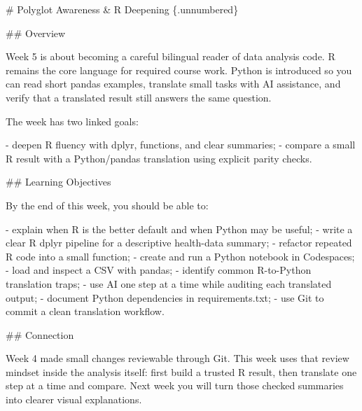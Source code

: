 \documentclass[
  letterpaper,
  DIV=11,
  numbers=noendperiod,
  oneside]{scrreprt}
\newenvironment{Shaded}{\begin{snugshade}}{\end{snugshade}}
\newcommand{\FunctionTok}[1]{\textcolor[rgb]{0.28,0.35,0.67}{#1}}
\newcommand{\InformationTok}[1]{\textcolor[rgb]{0.37,0.37,0.37}{#1}}
\newcommand{\NormalTok}[1]{\textcolor[rgb]{0.00,0.23,0.31}{#1}}
\newcommand{\SpecialStringTok}[1]{\textcolor[rgb]{0.13,0.47,0.30}{#1}}
\begin{document}
\begin{Shaded}
\begin{Highlighting}[numbers=left,,]
\FunctionTok{\# Polyglot Awareness \& R Deepening \{.unnumbered\}}


\FunctionTok{\#\# Overview}

\NormalTok{Week 5 is about becoming a careful bilingual reader of data analysis code. R remains the core language for required course work. Python is introduced so you can read short }\InformationTok{\textasciigrave{}pandas\textasciigrave{}}\NormalTok{ examples, translate small tasks with AI assistance, and verify that a translated result still answers the same question.}

\NormalTok{The week has two linked goals:}

\SpecialStringTok{{-} }\NormalTok{deepen R fluency with }\InformationTok{\textasciigrave{}dplyr\textasciigrave{}}\NormalTok{, functions, and clear summaries;}
\SpecialStringTok{{-} }\NormalTok{compare a small R result with a Python/pandas translation using explicit parity checks.}

\FunctionTok{\#\# Learning Objectives}

\NormalTok{By the end of this week, you should be able to:}

\SpecialStringTok{{-} }\NormalTok{explain when R is the better default and when Python may be useful;}
\SpecialStringTok{{-} }\NormalTok{write a clear R }\InformationTok{\textasciigrave{}dplyr\textasciigrave{}}\NormalTok{ pipeline for a descriptive health{-}data summary;}
\SpecialStringTok{{-} }\NormalTok{refactor repeated R code into a small function;}
\SpecialStringTok{{-} }\NormalTok{create and run a Python notebook in Codespaces;}
\SpecialStringTok{{-} }\NormalTok{load and inspect a CSV with }\InformationTok{\textasciigrave{}pandas\textasciigrave{}}\NormalTok{;}
\SpecialStringTok{{-} }\NormalTok{identify common R{-}to{-}Python translation traps;}
\SpecialStringTok{{-} }\NormalTok{use AI one step at a time while auditing each translated output;}
\SpecialStringTok{{-} }\NormalTok{document Python dependencies in }\InformationTok{\textasciigrave{}requirements.txt\textasciigrave{}}\NormalTok{;}
\SpecialStringTok{{-} }\NormalTok{use Git to commit a clean translation workflow.}

\FunctionTok{\#\# Connection}

\NormalTok{Week 4 made small changes reviewable through Git. This week uses that review mindset inside the analysis itself: first build a trusted R result, then translate one step at a time and compare. Next week you will turn those checked summaries into clearer visual explanations.}


\end{Highlighting}
\end{Shaded}
\end{document}
